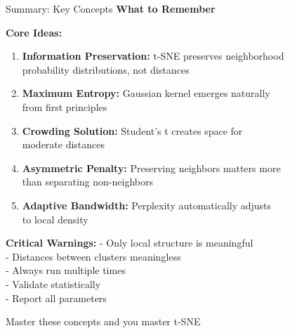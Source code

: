\documentclass[10pt]{beamer}
\newcommand{\emphtext}[1]{\textcolor{upcblue}{\textbf{#1}}}
\newcommand{\conceptbox}[1]{\colorbox{upcblue!10}{\begin{minipage}{0.85\textwidth}\centering #1\end{minipage}}}
\begin{document}
\begin{frame}{Summary: Key Concepts}
\emphtext{What to Remember}

\vspace{0.3cm}
\textbf{Core Ideas:}
\footnotesize
\begin{enumerate}
\item \textbf{Information Preservation:} t-SNE preserves neighborhood\\
    probability distributions, not distances
\item \textbf{Maximum Entropy:} Gaussian kernel emerges naturally\\
    from first principles
\item \textbf{Crowding Solution:} Student's t creates space for\\
    moderate distances
\item \textbf{Asymmetric Penalty:} Preserving neighbors matters more\\
    than separating non-neighbors
\item \textbf{Adaptive Bandwidth:} Perplexity automatically adjusts\\
    to local density
\end{enumerate}

\vspace{0.3cm}
\textbf{Critical Warnings:}
\footnotesize
- Only local structure is meaningful\\
- Distances between clusters meaningless\\
- Always run multiple times\\
- Validate statistically\\
- Report all parameters

\begin{center}
\conceptbox{\footnotesize Master these concepts and you master t-SNE}
\end{center}
\end{frame}
\end{document}
